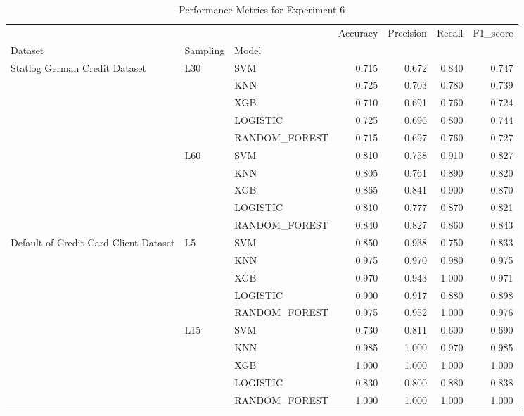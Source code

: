 \begin{table}
\caption{Performance Metrics for Experiment 6}
\label{tab:experiment_6_results}
\begin{tabular}{lllrrrr}
\toprule
 &  &  & Accuracy & Precision & Recall & F1\_score \\
Dataset & Sampling & Model &  &  &  &  \\
\midrule
\multirow[t]{10}{*}{Statlog German Credit Dataset} & \multirow[t]{5}{*}{L30} & SVM & 0.715 & 0.672 & 0.840 & 0.747 \\
 &  & KNN & 0.725 & 0.703 & 0.780 & 0.739 \\
 &  & XGB & 0.710 & 0.691 & 0.760 & 0.724 \\
 &  & LOGISTIC & 0.725 & 0.696 & 0.800 & 0.744 \\
 &  & RANDOM\_FOREST & 0.715 & 0.697 & 0.760 & 0.727 \\
\cline{2-7}
 & \multirow[t]{5}{*}{L60} & SVM & 0.810 & 0.758 & 0.910 & 0.827 \\
 &  & KNN & 0.805 & 0.761 & 0.890 & 0.820 \\
 &  & XGB & 0.865 & 0.841 & 0.900 & 0.870 \\
 &  & LOGISTIC & 0.810 & 0.777 & 0.870 & 0.821 \\
 &  & RANDOM\_FOREST & 0.840 & 0.827 & 0.860 & 0.843 \\
\cline{1-7} \cline{2-7}
\multirow[t]{10}{*}{Default of Credit Card Client Dataset} & \multirow[t]{5}{*}{L5} & SVM & 0.850 & 0.938 & 0.750 & 0.833 \\
 &  & KNN & 0.975 & 0.970 & 0.980 & 0.975 \\
 &  & XGB & 0.970 & 0.943 & 1.000 & 0.971 \\
 &  & LOGISTIC & 0.900 & 0.917 & 0.880 & 0.898 \\
 &  & RANDOM\_FOREST & 0.975 & 0.952 & 1.000 & 0.976 \\
\cline{2-7}
 & \multirow[t]{5}{*}{L15} & SVM & 0.730 & 0.811 & 0.600 & 0.690 \\
 &  & KNN & 0.985 & 1.000 & 0.970 & 0.985 \\
 &  & XGB & 1.000 & 1.000 & 1.000 & 1.000 \\
 &  & LOGISTIC & 0.830 & 0.800 & 0.880 & 0.838 \\
 &  & RANDOM\_FOREST & 1.000 & 1.000 & 1.000 & 1.000 \\
\cline{1-7} \cline{2-7}
\bottomrule
\end{tabular}
\end{table}
